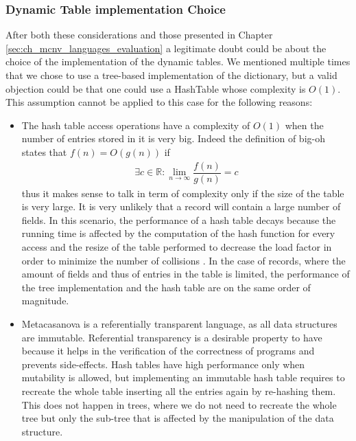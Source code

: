 \subsubsection{Dynamic Table implementation Choice}
After both these considerations and those presented in Chapter \ref{sec:ch_mcnv_languages_evaluation} a legitimate doubt could be about the choice of the implementation of the dynamic tables. We mentioned multiple times that we chose to use a tree-based implementation of the dictionary, but a valid objection could be that one could use a HashTable whose complexity is $O(1)$. This assumption cannot be applied to this case for the following reasons:

\begin{itemize}
\item The hash table access operations have a complexity of $O(1)$ when the number of entries stored in it is very big. Indeed the definition of big-oh states that $f(n) = O(g(n))$ if
\begin{align*}
\exists c \in \mathbb{R}: \lim_{n \to \infty}\dfrac{f(n)}{g(n)} = c
\end{align*}
\noindent
thus it makes sense to talk in term of complexity only if the size of the table is very large. It is very unlikely that a record will contain a large number of fields. In this scenario, the performance of a hash table decays because the running time is affected by the computation of the hash function for every access and the resize of the table performed to decrease the load factor in order to minimize the number of collisions \cite{cormen2001introduction}. In the case of records, where the amount of fields and thus of entries in the table is limited, the performance of the tree implementation and the hash table are on the same order of magnitude.
\item  Metacasanova is a referentially transparent language, as all data structures are immutable. Referential transparency is a desirable property to have because it helps in the verification of the correctness of programs \cite{linger1988case, trammell1996incremental} and prevents side-effects. Hash tables have high performance only when mutability is allowed, but implementing an immutable hash table requires to recreate the whole table inserting all the entries again by re-hashing them. This does not happen in trees, where we do not need to recreate the whole tree but only the sub-tree that is affected by the manipulation of the data structure.
\end{itemize}

